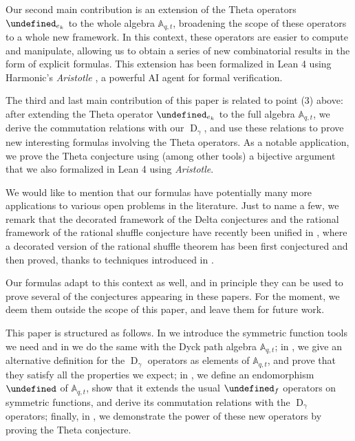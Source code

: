 \documentclass[reqno]{amsart}
\theoremstyle{plain}
\theoremstyle{definition}
\theoremstyle{remark}
\DeclareMathOperator{\D}{D}
\newcommand{\A}{\mathbb{A}}%
\let\oldTheta\Theta
\let\Theta\undefined
\DeclareMathOperator{\Theta}{\oldTheta}
\newcommand{\<}{\langle}
\renewcommand{\>}{\rangle}
\begin{document}
Our second main contribution is an extension of the Theta operators $\Theta_{e_k}$ to the whole algebra $\A_{q,t}$, broadening the scope of these operators to a whole new framework. 
In this context, these operators are easier to compute and manipulate, allowing us to obtain a series of new combinatorial results in the form of explicit formulas. This extension has been formalized in Lean 4 using Harmonic's \emph{Aristotle} \cite{Achim2025Aristotle}, a powerful AI agent for formal verification.

The third and last main contribution of this paper is related to point (3) above: after extending the Theta operator $\Theta_{e_k}$ to the full algebra $\A_{q,t}$, we derive the commutation relations with our $\D_\gamma$, and use these relations to prove new interesting formulas involving the Theta operators. As a notable application, we prove the Theta conjecture \cite[Conjecture~9.1]{DAdderioIraciVandenWyngaerd2021ThetaOperators} using (among other tools) a bijective argument that we also formalized in Lean 4 using \emph{Aristotle}.

We would like to mention that our formulas have potentially many more applications to various open problems in the literature. Just to name a few, we remark that the decorated framework of the Delta conjectures and the rational framework of the rational shuffle conjecture have recently been unified in \cite{IraciPagariaPaolini2026FallingStars}, where a decorated version of the rational shuffle theorem has been first conjectured and then proved, thanks to techniques introduced in \cite{GillespieGorskyGriffin2025Skewing}.

Our formulas adapt to this context as well, and in principle they can be used to prove several of the conjectures appearing in these papers. For the moment, we deem them outside the scope of this paper, and leave them for future work.

This paper is structured as follows. In  we introduce the symmetric function tools we need and in  we do the same with the Dyck path algebra $\A_{q,t}$; in , we give an alternative definition for the $\D_\gamma$ operators as elements of $\A_{q,t}$, and prove that they satisfy all the properties we expect; in , we define an endomorphism $\Theta$ of $\A_{q,t}$, show that it extends the usual $\Theta_f$ operators on symmetric functions, and derive its commutation relations with the $\D_\gamma$ operators; finally, in , we demonstrate the power of these new operators by proving the Theta conjecture.
\end{document}

